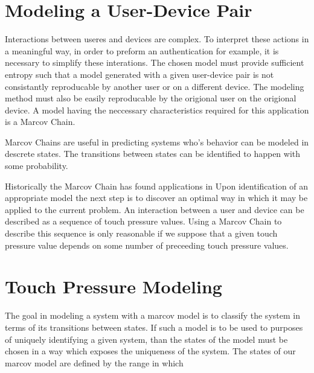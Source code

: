 \documentclass{acm_proc_article-sp}
\begin{document}
\section{Modeling a User-Device Pair}
\label{sec:modeling}
Interactions between useres and devices are complex. To interpret these actions in a meaningful way, in order to preform an authentication for example, it is necessary to simplify these interations. The chosen model must provide sufficient entropy such that a model generated with a given user-device pair is not consistantly reproducable by another user or on a different device. The modeling method must also be easily reproducable by the origional user on the origional device. A model having the neccessary characteristics required for this application is a Marcov Chain.

Marcov Chains are useful in predicting systems who's behavior can be modeled in descrete states. The transitions between states can be identified to happen with some probability.

Historically the Marcov Chain has found applications in
%
Upon identification of an appropriate model the next step is to discover an optimal way in which it may be applied to the current problem. An interaction between a user and device can be described as a sequence of touch pressure values. Using a Marcov Chain to describe this sequence is only reasonable if we suppose that a given touch pressure value depends on some number of preceeding touch pressure values. \cite{marcov_chains_previous_n_values}
%

\section{Touch Pressure Modeling}
%
The goal in modeling a system with a marcov model is to classify the system in terms of its transitions between states. If such a model is to be used to purposes of uniquely identifying a given system, than the states of the model must be chosen in a way which exposes the uniqueness of the system.
The states of our marcov model are defined by the range in which
\end{document}
